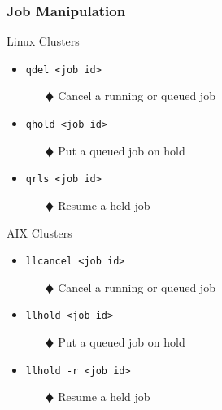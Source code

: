 \documentclass[slidestop,mathserif,compress,xcolor=svgnames,table]{beamer}
\newenvironment{bblock}[0]
{
\begin{beamerboxesrounded}[upper=uppercol1,lower=lowercol1,shadow=true]}
{\end{beamerboxesrounded}}
\begin{document}
\begin{frame}
  \frametitle{\small Job Manipulation}
  \begin{bblock}{Linux Clusters}
    \begin{itemize}
      \item \texttt{qdel <job id>}
      \begin{enumerate}
	\item[$\vardiamond$] Cancel a running or queued job
      \end{enumerate}
      \item \texttt{qhold <job id>}
      \begin{enumerate}
	\item[$\vardiamond$] Put a queued job on hold
      \end{enumerate}
      \item \texttt{qrls <job id>}
      \begin{enumerate}
	\item[$\vardiamond$] Resume a held job
      \end{enumerate}
    \end{itemize}
  \end{bblock}

  \begin{bblock}{AIX Clusters}
    \begin{itemize}
      \item \texttt{llcancel <job id>}
      \begin{enumerate}
	\item[$\vardiamond$] Cancel a running or queued job
      \end{enumerate}
      \item \texttt{llhold <job id>}
      \begin{enumerate}
	\item[$\vardiamond$] Put a queued job on hold
      \end{enumerate}
      \item \texttt{llhold -r <job id>}
      \begin{enumerate}
	\item[$\vardiamond$] Resume a held job
      \end{enumerate}
    \end{itemize}
  \end{bblock}
\end{frame}
\end{document}

